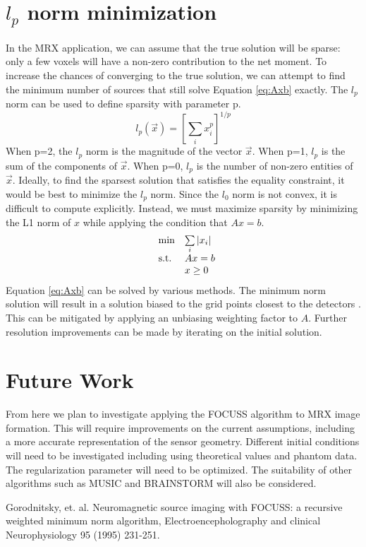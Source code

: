 \documentclass[a4paper]{article}
\begin{document}
\section{$l_{p}$ norm minimization}
In the MRX application, we can assume that the true solution will be sparse:  only a few voxels will have a non-zero contribution to the net moment.  To increase the chances of converging to the true solution, we can attempt to find the minimum number of sources that still solve Equation \ref{eq:Axb} exactly.  The $l_p$ norm can be used to define sparsity with parameter p.
 \begin{equation}
 l_{p}(\vec{x})=\left[\sum_{i}x_{i}^{p}\right]^{1/p} 
 \end{equation}
When p=2, the $l_{p}$ norm is the magnitude of the vector $\vec{x}$.  When p=1, $l_{p}$ is the sum of the components of $\vec{x}$.  When p=0, $l_{p}$ is the number of non-zero entities of $\vec{x}$.  Ideally, to find the sparsest solution that satisfies the equality constraint, it would be best to minimize the $l_{p}$ norm.  Since the $l_0$ norm is not convex, it is difficult to compute explicitly. Instead, we must maximize sparsity by minimizing the L1 norm of $x$ while applying the condition that $Ax = b$.
\begin{equation}
\centering
  \begin{array}{ll@{}r@{}r@{}l}
    \text{min} & \sum\limits_{i} |x_i| \\[\jot]
    \text{s.t.}& Ax = b \\
    & \multicolumn{4}{l}{x \geq 0}
  \end{array}
\end{equation}
Equation \ref{eq:Axb} can be solved by various methods.  The minimum norm solution will result in a solution biased to the grid points closest to the detectors \cite{Gorodnitsky}.  This can be mitigated by applying an unbiasing weighting factor to $A$.  Further resolution improvements can be made by iterating on the initial solution.

\section{Future Work}

From here we plan to investigate applying the FOCUSS algorithm to MRX image formation.  This will require improvements on the current assumptions, including a more accurate representation of the sensor geometry.  Different initial conditions will need to be investigated including using theoretical values and phantom data.  The regularization parameter will need to be optimized. The suitability of other algorithms such as MUSIC and BRAINSTORM will also be considered.


\begin{thebibliography}{2}
 Gorodnitsky, et. al. Neuromagnetic source imaging with FOCUSS: a recursive weighted minimum norm algorithm, Electroencepholography and clinical Neurophysiology 95 (1995) 231-251.
\end{thebibliography}
\end{document}
